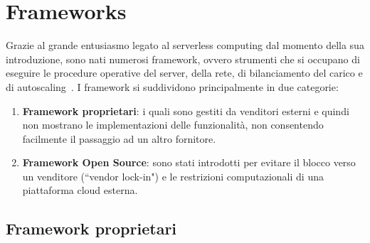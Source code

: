\documentclass[12pt,a4paper,openany,twoside]{book}
\begin{document}





\chapter{Frameworks}
\label{chap:frameworks}

Grazie al grande entusiasmo legato al serverless computing dal momento della sua introduzione, sono nati numerosi framework, ovvero strumenti che si occupano di eseguire le procedure operative del server, della rete, di bilanciamento del carico e di autoscaling~\cite{Palade2019}.
I framework si suddividono principalmente in due categorie:
\begin{enumerate}
    \item \textbf{Framework proprietari}: i quali sono gestiti da venditori esterni e quindi non mostrano le implementazioni delle funzionalità, non consentendo facilmente il passaggio ad un altro fornitore.
    
    \item \textbf{Framework Open Source}: sono stati introdotti per evitare il blocco verso un venditore (``vendor lock-in") e le restrizioni computazionali di una piattaforma cloud esterna.
\end{enumerate}

\section{Framework proprietari}
\end{document}
